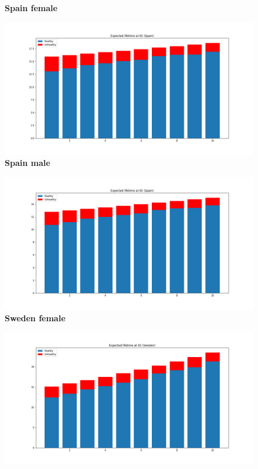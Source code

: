\begin{figure}[H]
\centering \textbf{Spain female}\par\medskip
  \includegraphics[width=\linewidth]{images/new_results/Spain_1_f.png}
 \endminipage\hfill
{}
\centering \textbf{Spain male}\par\medskip
  \includegraphics[width=\linewidth]{images/new_results/Spain_1_m.png}
\endminipage\hfill
{}
\centering \textbf{Sweden female}\par\medskip
  \includegraphics[width=\linewidth]{images/new_results/Sweden_1_f.png}

\end{figure}
